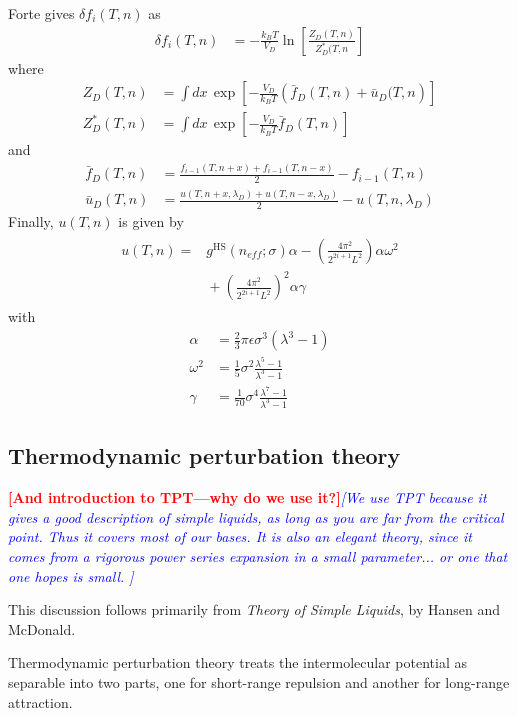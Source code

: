 \documentclass[letterpaper,twocolumn,amsmath,amssymb,prb]{revtex4-1}
\newcommand{\kT}{\ensuremath{k_BT}}
\newcommand{\1}{\ensuremath{\textbf{r}_1}}
\newcommand{\2}{\ensuremath{\textbf{r}_2}}
\newcommand{\3}{\ensuremath{\textbf{r}_3}}
\newcommand{\4}{\ensuremath{\textbf{r}_4}}
\newcommand{\fixme}[1]{\textcolor{red}{\textbf{[#1]}}}
\newcommand{\davidsays}[1]{\textcolor{blue}{\textit{[#1]}}}
\begin{document}
Forte gives $\delta f_i(T,n)$ as
\begin{align}
  \delta f_i(T,n) &= -\frac{\kT}{V_D}\ln\left[ \frac{Z_D(T,n)}{Z_D^*(T,n} \right]
\end{align}
where
\begin{align}
  Z_D(T,n) &= \int dx\, \exp\left[ -\frac{V_D}{\kT}\left( \bar{f}_D(T,n) + \bar{u}_D(T,n \right) \right] \\
  Z_D^*(T,n) &= \int dx\, \exp\left[ -\frac{V_D}{\kT}\bar{f}_D(T,n) \right]
\end{align}
and
\begin{align}
  \bar{f}_D(T,n) &= \frac{f_{i-1}(T,n+x) + f_{i-1}(T,n-x)}{2} - f_{i-1}(T,n) \\
  \bar{u}_D(T,n) &= \frac{u(T,n+x,\lambda_D) + u(T,n-x,\lambda_D)}{2} - u(T,n,\lambda_D)
\end{align}
Finally, $u(T,n)$ is given by
\begin{align}
  \begin{split}
  u(T,n) = &{} g^\text{HS}(n_{eff};\sigma)\alpha - \left( \frac{4\pi^2}{2^{2i+1}L^2} \right)\alpha\omega^2 \\ &{} + \left( \frac{4\pi^2}{2^{2i+1}L^2} \right)^2\alpha\gamma
  \end{split}
\end{align}
with
\begin{align}
  \alpha &= \frac{2}{3}\pi\epsilon\sigma^3(\lambda^3 - 1) \\
  \omega^2 &= \frac{1}{5}\sigma^2\frac{\lambda^5 - 1}{\lambda^3 - 1} \\
  \gamma &= \frac{1}{70}\sigma^4\frac{\lambda^7 - 1}{\lambda^3 - 1}
\end{align}


\subsection{Thermodynamic perturbation theory}\label{subsec:TPT}

\fixme{And introduction to TPT---why do we use it?}\davidsays{We use
  TPT because it gives a good description of simple liquids, as long
  as you are far from the critical point.  Thus it covers most of our
  bases.  It is also an elegant theory, since it comes from a rigorous
  power series expansion in a small parameter... or one that one hopes
  is small. }

This discussion follows primarily from \textit{Theory of Simple
  Liquids}, by Hansen and McDonald\cite{Hansen06}.

Thermodynamic perturbation theory treats the intermolecular potential
as separable into two parts, one for short-range repulsion and another
for long-range attraction.
\end{document}
